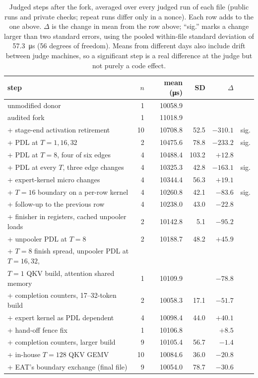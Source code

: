\documentclass[11pt]{article}
\begin{document}
\begin{table}[t]
\centering
\caption{Judged steps after the fork, averaged over every judged run of each file
(public runs and private checks; repeat runs differ only in a nonce). Each row adds
to the one above. $\Delta$ is the change in mean from the row above; ``sig.'' marks
a change larger than two standard errors, using the pooled within-file standard
deviation of \SI{57.3}{\micro\second} (56 degrees of freedom). Means from different
days also include drift between judge machines, so a significant step is a real
difference at the judge but not purely a code effect.}
\label{tab:steps}
\small
\begin{tabular}{lrrrrl}
\toprule
step & $n$ & mean (\si{\micro\second}) & SD & $\Delta$ & \\
\midrule
unmodified donor & 1 & \num{10058.9} & & & \\
audited fork & 1 & \num{11018.9} & & & \\
+ stage-end activation retirement & 10 & \num{10708.8} & 52.5 & $-310.1$ & sig.\\
+ PDL at $T = 1, 16, 32$ & 2 & \num{10475.6} & 78.8 & $-233.2$ & sig.\\
+ PDL at $T = 8$, four of six edges & 4 & \num{10488.4} & 103.2 & $+12.8$ & \\
+ PDL at every $T$, three edge changes & 4 & \num{10325.3} & 42.8 & $-163.1$ & sig.\\
+ expert-kernel micro changes & 4 & \num{10344.4} & 56.3 & $+19.1$ & \\
+ $T=16$ boundary on a per-row kernel & 4 & \num{10260.8} & 42.1 & $-83.6$ & sig.\\
+ follow-up to the previous row & 4 & \num{10238.0} & 43.0 & $-22.8$ & \\
+ finisher in registers, cached unpooler loads & 2 & \num{10142.8} & 5.1 & $-95.2$ & \\
+ unpooler PDL at $T=8$ & 2 & \num{10188.7} & 48.2 & $+45.9$ & \\
+ $T=8$ finish spread, unpooler PDL at $T=16,32$, & & & & & \\
\quad $T=1$ QKV build, attention shared memory & 1 & \num{10109.9} & & $-78.8$ & \\
+ completion counters, 17--32-token build & 2 & \num{10058.3} & 17.1 & $-51.7$ & \\
+ expert kernel as PDL dependent & 4 & \num{10098.4} & 44.0 & $+40.1$ & \\
+ hand-off fence fix & 1 & \num{10106.8} & & $+8.5$ & \\
+ completion counters, larger build & 9 & \num{10105.4} & 56.7 & $-1.4$ & \\
+ in-house $T=128$ QKV GEMV & 10 & \num{10084.6} & 36.0 & $-20.8$ & \\
+ EAT's boundary exchange (final file) & 9 & \num{10054.0} & 78.7 & $-30.6$ & \\
\bottomrule
\end{tabular}
\end{table}
\end{document}
